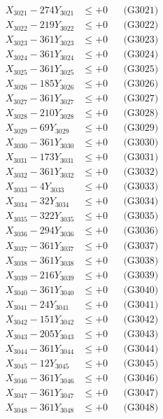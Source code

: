 \documentclass[a4paper,10pt]{article}
\begin{document}
{\begin{align}
\allowbreak
X_{3021} - 274Y_{3021} &\leq +0 && \text{(G3021)} \\
X_{3022} - 219Y_{3022} &\leq +0 && \text{(G3022)} \\
X_{3023} - 361Y_{3023} &\leq +0 && \text{(G3023)} \\
X_{3024} - 361Y_{3024} &\leq +0 && \text{(G3024)} \\
X_{3025} - 361Y_{3025} &\leq +0 && \text{(G3025)} \\
X_{3026} - 185Y_{3026} &\leq +0 && \text{(G3026)} \\
X_{3027} - 361Y_{3027} &\leq +0 && \text{(G3027)} \\
X_{3028} - 210Y_{3028} &\leq +0 && \text{(G3028)} \\
X_{3029} - 69Y_{3029} &\leq +0 && \text{(G3029)} \\
X_{3030} - 361Y_{3030} &\leq +0 && \text{(G3030)} \\
\allowbreak
X_{3031} - 173Y_{3031} &\leq +0 && \text{(G3031)} \\
X_{3032} - 361Y_{3032} &\leq +0 && \text{(G3032)} \\
X_{3033} - 4Y_{3033} &\leq +0 && \text{(G3033)} \\
X_{3034} - 32Y_{3034} &\leq +0 && \text{(G3034)} \\
X_{3035} - 322Y_{3035} &\leq +0 && \text{(G3035)} \\
X_{3036} - 294Y_{3036} &\leq +0 && \text{(G3036)} \\
X_{3037} - 361Y_{3037} &\leq +0 && \text{(G3037)} \\
X_{3038} - 361Y_{3038} &\leq +0 && \text{(G3038)} \\
X_{3039} - 216Y_{3039} &\leq +0 && \text{(G3039)} \\
X_{3040} - 361Y_{3040} &\leq +0 && \text{(G3040)} \\
\allowbreak
X_{3041} - 24Y_{3041} &\leq +0 && \text{(G3041)} \\
X_{3042} - 151Y_{3042} &\leq +0 && \text{(G3042)} \\
X_{3043} - 205Y_{3043} &\leq +0 && \text{(G3043)} \\
X_{3044} - 361Y_{3044} &\leq +0 && \text{(G3044)} \\
X_{3045} - 12Y_{3045} &\leq +0 && \text{(G3045)} \\
X_{3046} - 361Y_{3046} &\leq +0 && \text{(G3046)} \\
X_{3047} - 361Y_{3047} &\leq +0 && \text{(G3047)} \\
X_{3048} - 361Y_{3048} &\leq +0 && \text{(G3048)} \\

\end{align}}
\end{document}
